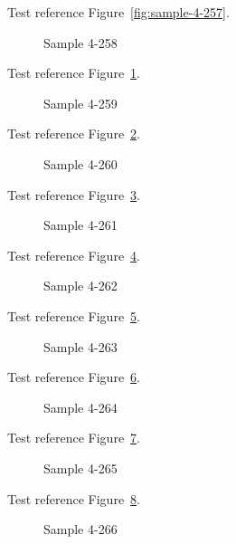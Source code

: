 Test reference Figure~\ref{fig:sample-4-257}.

\begin{figure}[tbhp]
\caption{Sample 4-258}
\label{fig:sample-4-258}
\end{figure}

Test reference Figure~\ref{fig:sample-4-258}.

\begin{figure}[tbhp]
\caption{Sample 4-259}
\label{fig:sample-4-259}
\end{figure}

Test reference Figure~\ref{fig:sample-4-259}.

\begin{figure}[tbhp]
\caption{Sample 4-260}
\label{fig:sample-4-260}
\end{figure}

Test reference Figure~\ref{fig:sample-4-260}.

\begin{figure}[tbhp]
\caption{Sample 4-261}
\label{fig:sample-4-261}
\end{figure}

Test reference Figure~\ref{fig:sample-4-261}.

\begin{figure}[tbhp]
\caption{Sample 4-262}
\label{fig:sample-4-262}
\end{figure}

Test reference Figure~\ref{fig:sample-4-262}.

\begin{figure}[tbhp]
\caption{Sample 4-263}
\label{fig:sample-4-263}
\end{figure}

Test reference Figure~\ref{fig:sample-4-263}.

\begin{figure}[tbhp]
\caption{Sample 4-264}
\label{fig:sample-4-264}
\end{figure}

Test reference Figure~\ref{fig:sample-4-264}.

\begin{figure}[tbhp]
\caption{Sample 4-265}
\label{fig:sample-4-265}
\end{figure}

Test reference Figure~\ref{fig:sample-4-265}.

\begin{figure}[tbhp]
\caption{Sample 4-266}
\label{fig:sample-4-266}
\end{figure}

